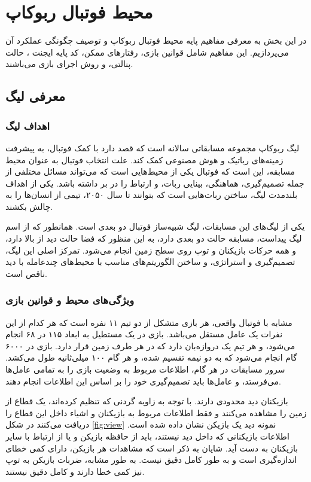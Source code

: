 \chapter{محیط فوتبال ربوکاپ}
در این بخش به معرفی مفاهیم پایه محیط فوتبال ربوکاپ و توصیف چگونگی عملکرد آن می‌پردازیم.
این مفاهیم شامل قوانین بازی، رفتار‌های ممکن، کد پایه ایجنت
، حالت پنالتی، و روش اجرای بازی می‌باشند.
\section{معرفی لیگ}
\subsection{اهداف لیگ}
لیگ ربوکاپ مجموعه مسابقاتی سالانه است که قصد دارد با کمک فوتبال، به پیشرفت زمینه‌های رباتیک و هوش مصنوعی کمک کند.
علت انتخاب فوتبال به عنوان محیط مسابقه، این است که فوتبال یکی از محیط‌هایی است که می‌تواند مسائل مختلفی از جمله تصمیم‌گیری، هماهنگی، بینایی ربات، و ارتباط را در بر داشته باشد.
یکی از اهداف بلندمدت لیگ، ساختن ربات‌هایی است که بتوانند تا سال ۲۰۵۰، تیمی از انسان‌ها را به چالش بکشند.

یکی از لیگ‌های این مسابقات، لیگ شبیه‌ساز فوتبال دو بعدی است.
همانطور که از اسم لیگ پیداست، مسابقه حالت دو بعدی دارد، به این منظور که فضا حالت دید از بالا دارد، و همه حرکات بازیکنان و توپ روی سطح زمین انجام می‌شود.
تمرکز اصلی این لیگ، تصمیم‌گیری و استراتژی، و ساختن الگوریتم‌های مناسب با محیط‌های چند‌عامله با دید ناقص است.
\subsection{ویژگی‌های محیط و قوانین بازی}
مشابه با فوتبال واقعی، هر بازی متشکل از دو تیم ۱۱ نفره است که هر کدام از این نفرات یک عامل مستقل می‌باشد.
بازی در یک مستطیل به ابعاد ۱۱۵ در ۶۸ انجام می‌شود، و هر تیم یک دروازه‌بان دارد که در هر طرف زمین قرار دارد.
بازی در ۶۰۰۰ گام
 انجام می‌شود که به دو نیمه تقسیم‌ شده، و هر گام ۱۰۰ میلی‌ثانیه طول می‌کشد. سرور مسابقات در هر گام، اطلاعات مربوط به وضعیت بازی را به تمامی عامل‌ها می‌فرستد، و عامل‌ها باید تصمیم‌گیری خود را بر اساس این اطلاعات انجام دهند.

بازیکنان دید محدودی دارند. با توجه به زاویه گردنی که تنظیم کرده‌اند، یک قطاع از زمین را مشاهده می‌کنند و فقط اطلاعات مربوط به بازیکنان و اشیاء داخل این قطاع را دریافت می‌کنند در شکل \ref{fig:view} نمونه دید یک بازیکن نشان داده شده است.
اطلاعات بازیکنانی که داخل دید نیستند، باید از حافظه بازیکن و یا از ارتباط با سایر بازیکنان به دست آید.
شایان به ذکر است که مشاهدات هر بازیکن، دارای کمی خطای اندازه‌گیری است و به طور کامل دقیق نیست. به طور مشابه، ضربات بازیکن به توپ نیز کمی خطا دارند و کامل دقیق نیستند.

